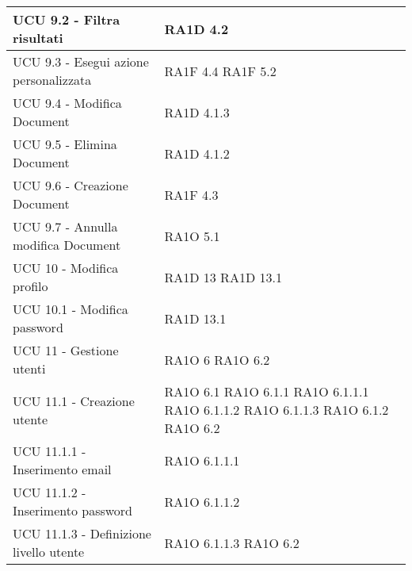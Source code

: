 \begin{center}
\begin{longtable}{ | p{5cm} | p{5cm} |}
            UCU 9.2 - Filtra risultati &  RA1D 4.2 \newline  \\ \hline      
            UCU 9.3 - Esegui azione personalizzata &  RA1F 4.4 \newline  RA1F 5.2 \newline  \\ \hline      
            UCU 9.4 - Modifica Document &  RA1D 4.1.3 \newline  \\ \hline      
            UCU 9.5 - Elimina Document &  RA1D 4.1.2 \newline  \\ \hline      
            UCU 9.6 - Creazione Document &  RA1F 4.3 \newline  \\ \hline      
            UCU 9.7 - Annulla modifica Document &  RA1O 5.1 \newline  \\ \hline      
            UCU 10 - Modifica profilo &  RA1D 13 \newline  RA1D 13.1 \newline  \\ \hline      
            UCU 10.1 - Modifica password &  RA1D 13.1 \newline  \\ \hline      
            UCU 11 - Gestione utenti &  RA1O 6 \newline  RA1O 6.2 \newline  \\ \hline      
            UCU 11.1 - Creazione utente &  RA1O 6.1 \newline  RA1O 6.1.1 \newline  RA1O 6.1.1.1 \newline  RA1O 6.1.1.2 \newline  RA1O 6.1.1.3 \newline  RA1O 6.1.2 \newline  RA1O 6.2 \newline  \\ \hline      
            UCU 11.1.1 - Inserimento email &  RA1O 6.1.1.1 \newline  \\ \hline      
            UCU 11.1.2 - Inserimento password &  RA1O 6.1.1.2 \newline  \\ \hline      
            UCU 11.1.3 - Definizione livello utente &  RA1O 6.1.1.3 \newline  RA1O 6.2 \newline  \\ \hline      

\end{longtable}
\end{center}
